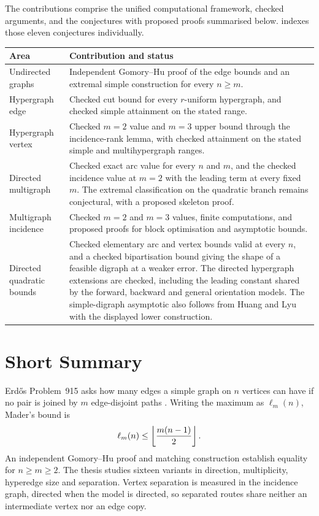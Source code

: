 The contributions comprise the unified computational framework, checked
arguments, and the conjectures with proposed proofs summarised below.
 indexes those eleven conjectures individually.
\begin{center}
\small
\begin{tabularx}{\textwidth}{@{}>{\raggedright\arraybackslash}p{}X@{}}
\toprule
Area & Contribution and status \\
\midrule
Undirected graphs & Independent Gomory--Hu proof of the edge bounds and an extremal simple construction for every $n\ge m$. \\
Hypergraph edge & Checked cut bound for every $r$-uniform hypergraph, and checked simple attainment on the stated range. \\
Hypergraph vertex & Checked $m=2$ value and $m=3$ upper bound through the incidence-rank lemma, with checked attainment on the stated simple and multihypergraph ranges. \\
Directed multigraph & Checked exact arc value for every $n$ and $m$, and the checked incidence value at $m=2$ with the leading term at every fixed $m$. The extremal classification on the quadratic branch remains conjectural, with a proposed skeleton proof. \\
Multigraph incidence & Checked $m=2$ and $m=3$ values, finite computations, and proposed proofs for block optimisation and asymptotic bounds. \\
Directed quadratic bounds & Checked elementary arc and vertex bounds valid at every $n$, and a checked bipartisation bound giving the shape of a feasible digraph at a weaker error. The directed hypergraph extensions are checked, including the leading constant shared by the forward, backward and general orientation models. The simple-digraph asymptotic also follows from Huang and Lyu \cite{HuangLyu26} with the displayed lower construction. \\
\bottomrule
\end{tabularx}
\end{center}

\chapter*{Short Summary}
Erd\H{o}s Problem~915 asks how many edges a simple graph on $n$ vertices can
have if no pair is joined by $m$ edge-disjoint paths
\cite{BollobasErdos62,ErdosProblems}. Writing the maximum as $\ell_m(n)$,
Mader's bound is
\[
 \ell_m(n)\le\left\lfloor \frac{m(n-1)}{2} \right\rfloor.
\]
An independent Gomory--Hu proof and matching construction establish equality for $n\ge m\ge2$. The thesis studies sixteen variants in direction, multiplicity, hyperedge size and separation. Vertex separation is measured in the incidence
graph, directed when the model is directed, so separated routes share
neither an intermediate vertex nor an edge copy.

